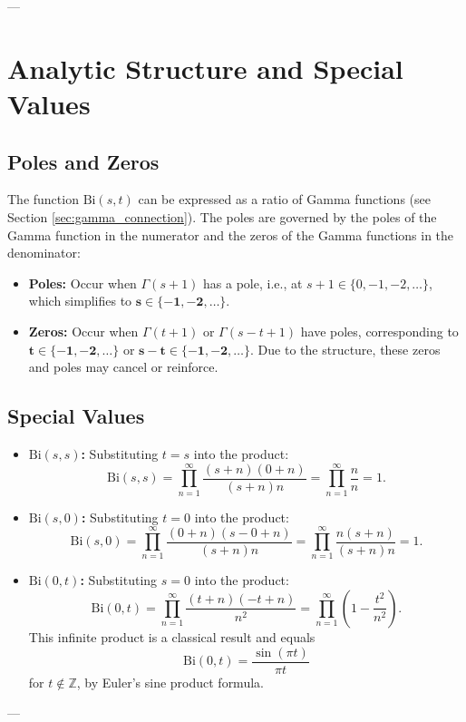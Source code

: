 \documentclass{article}
\newcommand{\Bi}{\mathrm{Bi}}
\begin{document}
---

\section{Analytic Structure and Special Values}

\subsection{Poles and Zeros}
The function $\Bi(s,t)$ can be expressed as a ratio of Gamma functions (see Section \ref{sec:gamma_connection}). The poles are governed by the poles of the Gamma function in the numerator and the zeros of the Gamma functions in the denominator:
\begin{itemize}
    \item \textbf{Poles:} Occur when $\Gamma(s+1)$ has a pole, i.e., at $s+1 \in \{0, -1, -2, \ldots\}$, which simplifies to $\mathbf{s \in \{-1, -2, \ldots\}}$.
    \item \textbf{Zeros:} Occur when $\Gamma(t+1)$ or $\Gamma(s-t+1)$ have poles, corresponding to $\mathbf{t \in \{-1, -2, \ldots\}}$ or $\mathbf{s-t \in \{-1, -2, \ldots\}}$. Due to the structure, these zeros and poles may cancel or reinforce.
\end{itemize}

\subsection{Special Values}
\begin{itemize}
    \item \textbf{$\Bi(s,s)$:} Substituting $t=s$ into the product:
    $$
    \Bi(s,s) = \prod_{n=1}^\infty \frac{(s+n)(0+n)}{(s+n)n} = \prod_{n=1}^\infty \frac{n}{n} = 1.
    $$
    \item \textbf{$\Bi(s,0)$:} Substituting $t=0$ into the product:
    $$
    \Bi(s,0) = \prod_{n=1}^\infty \frac{(0+n)(s-0+n)}{(s+n)n} = \prod_{n=1}^\infty \frac{n(s+n)}{(s+n)n} = 1.
    $$
    \item \textbf{$\Bi(0,t)$:} Substituting $s=0$ into the product:
    $$
    \Bi(0,t) = \prod_{n=1}^\infty \frac{(t+n)(-t+n)}{n^2} = \prod_{n=1}^\infty \left(1 - \frac{t^2}{n^2}\right).
    $$
    This infinite product is a classical result and equals
    $$
    \Bi(0,t) = \frac{\sin(\pi t)}{\pi t}
    $$
    for $t \notin \mathbb{Z}$, by Euler's sine product formula.
\end{itemize}

---
\end{document}
